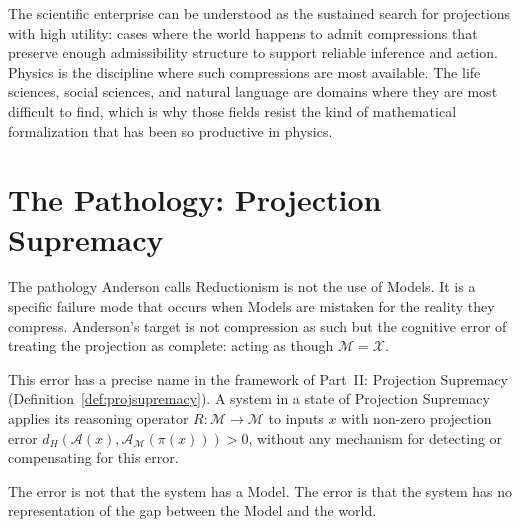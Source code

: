 \documentclass[12pt, a4paper, oneside]{book}
\newcommand{\Adm}{\mathcal{A}}
\newcommand{\X}{\mathcal{X}}
\newcommand{\M}{\mathcal{M}}
\newcommand{\proj}{\pi}
\newcommand{\dH}{d_H}
\begin{document}
The scientific enterprise can be understood as the sustained search for
projections with high utility: cases where the world happens to admit
compressions that preserve enough admissibility structure to support
reliable inference and action. Physics is the discipline where such
compressions are most available. The life sciences, social sciences, and
natural language are domains where they are most difficult to find,
which is why those fields resist the kind of mathematical formalization
that has been so productive in physics.

\section{The Pathology: Projection Supremacy}

The pathology Anderson calls Reductionism is not the use of Models.
It is a specific failure mode that occurs when Models are mistaken
for the reality they compress.
Anderson's target is not compression as such but the cognitive error of
treating the projection as complete: acting as though $\M = \X$.

This error has a precise name in the framework of Part~II:
Projection Supremacy (Definition~\ref{def:projsupremacy}).
A system in a state of Projection Supremacy applies its reasoning
operator $R : \M \to \M$ to inputs $x$ with non-zero projection error
$\dH(\Adm(x), \Adm_\M(\proj(x))) > 0$, without any mechanism for
detecting or compensating for this error.

The error is not that the system has a Model.
The error is that the system has no representation of the gap between
the Model and the world.
\end{document}
